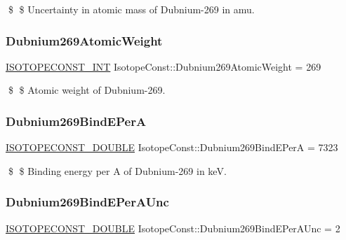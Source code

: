 \$ \$ Uncertainty in atomic mass of Dubnium-\/269 in amu. \mbox{\label{group___isotope_const-_dubnium-_db269_ga39bce6ddb6a52601b01d30bbdb497aeb}} 
\subsubsection{\texorpdfstring{Dubnium269\+Atomic\+Weight}{Dubnium269AtomicWeight}}
{\footnotesize\ttfamily \mbox{\hyperlink{group___isotope_const-_macros_ga5f18360b3e99483a35c32d789e62621c}{I\+S\+O\+T\+O\+P\+E\+C\+O\+N\+S\+T\+\_\+\+I\+NT}} Isotope\+Const\+::\+Dubnium269\+Atomic\+Weight = 269}

\$ \$ Atomic weight of Dubnium-\/269. \mbox{\label{group___isotope_const-_dubnium-_db269_ga29adc972dfe1789903fe0267b0b197b4}} 
\subsubsection{\texorpdfstring{Dubnium269\+Bind\+E\+PerA}{Dubnium269BindEPerA}}
{\footnotesize\ttfamily \mbox{\hyperlink{group___isotope_const-_macros_ga8f45a7272ce02c0b4c65c44636ed719a}{I\+S\+O\+T\+O\+P\+E\+C\+O\+N\+S\+T\+\_\+\+D\+O\+U\+B\+LE}} Isotope\+Const\+::\+Dubnium269\+Bind\+E\+PerA = 7323}

\$ \$ Binding energy per A of Dubnium-\/269 in keV. \mbox{\label{group___isotope_const-_dubnium-_db269_ga0f7ea1ae0f6be7b713823ce9ec6782a8}} 
\subsubsection{\texorpdfstring{Dubnium269\+Bind\+E\+Per\+A\+Unc}{Dubnium269BindEPerAUnc}}
{\footnotesize\ttfamily \mbox{\hyperlink{group___isotope_const-_macros_ga8f45a7272ce02c0b4c65c44636ed719a}{I\+S\+O\+T\+O\+P\+E\+C\+O\+N\+S\+T\+\_\+\+D\+O\+U\+B\+LE}} Isotope\+Const\+::\+Dubnium269\+Bind\+E\+Per\+A\+Unc = 2}

